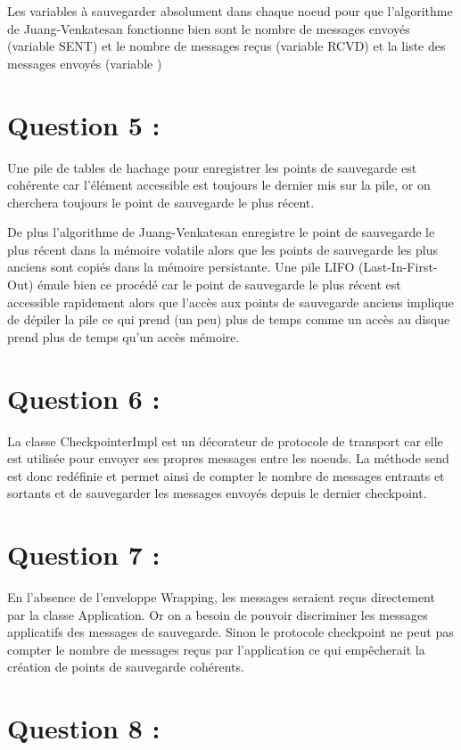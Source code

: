 \documentclass[11pt,a4paper]{report}
\begin{document}
Les variables à sauvegarder absolument dans chaque noeud pour que l'algorithme de Juang-Venkatesan fonctionne bien sont le nombre de messages envoyés (variable SENT) et le nombre de messages reçus (variable RCVD) et la liste des messages envoyés (variable )


\section{Question 5 :}

Une pile de tables de hachage pour enregistrer les points de sauvegarde est cohérente car l'élément accessible est toujours le dernier mis sur la pile, or on cherchera toujours le point de sauvegarde le plus récent.

De plus l'algorithme de Juang-Venkatesan enregistre le point de sauvegarde le plus récent dans la mémoire volatile alors que les points de sauvegarde les plus anciens sont copiés dans la mémoire persistante.
Une pile LIFO (Last-In-First-Out) émule bien ce procédé car le point de sauvegarde le plus récent est accessible rapidement alors que l'accès aux points de sauvegarde anciens implique de dépiler la pile ce qui prend (un peu) plus de temps comme un accès au disque prend plus de temps qu'un accès mémoire. 


\section{Question 6 :}

La classe CheckpointerImpl est un décorateur de protocole de transport car elle est utilisée pour envoyer ses propres messages entre les noeuds. La méthode send est donc redéfinie et permet ainsi de compter le nombre de messages entrants et sortants et de sauvegarder les messages envoyés depuis le dernier checkpoint.


\section{Question 7 :}

En l'absence de l'enveloppe Wrapping, les messages seraient reçus directement par la classe Application. Or on a besoin de pouvoir discriminer les messages applicatifs des messages de sauvegarde. Sinon le protocole checkpoint ne peut pas compter le nombre de messages reçus par l'application ce qui empêcherait la création de points de sauvegarde cohérents.


\section{Question 8 :}
\end{document}
